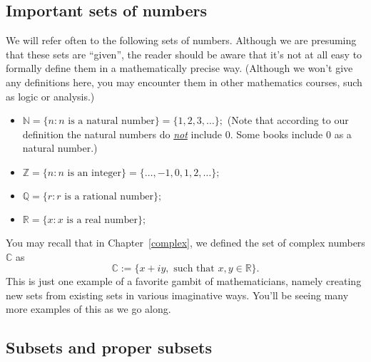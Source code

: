 \subsection{Important sets of numbers}
We will refer often to the following sets of numbers. Although we are presuming that these sets are ``given'', the reader should be aware that it's not at all easy to formally define them in a mathematically precise way.  (Although we won't give any definitions here,  you may encounter them in other mathematics courses, such as logic or analysis.)
\begin{itemize}
\item
${\mathbb N}\label{naturalnum}  = \{n: n \text{ is a natural number}\}  = \{1, 2, 3, \ldots \};$ (Note that according to our definition the natural numbers do \emph{\underline{not}} include $0$. Some books include $0$ as a natural number.) 
\item
${\mathbb Z}\label{sets_integers}  = \{n : n \text{ is an integer} \} = \{\ldots, -1, 0, 1,  2, \ldots \};$
\item
${\mathbb Q}\label{rationals} = \{r : r \text{ is a rational number}\};$
\item
${\mathbb R}\label{reals} = \{ x : x \text{ is a real number} \};$
\end{itemize}

You may recall that in  Chapter~\ref{complex}, we defined  the set of complex numbers ${\mathbb C}$ as
\[ {\mathbb C} := \{ x + iy, \text{ such that } x,y \in {\mathbb R} \}. \] 
This is just one example of a favorite gambit of mathematicians, namely creating new sets from existing sets in various imaginative ways. You'll be seeing many more examples of this as we go along.


\subsection *{Subsets and proper subsets}


